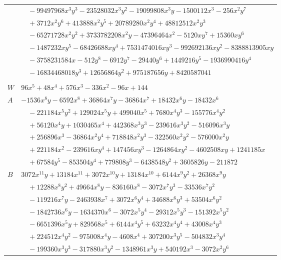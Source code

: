 \documentclass[11pt]{article}
\begin{document}
\begin{longtable}{@{}ll@{}}
 & $\quad -99497968x^{3}y^{3}-23528032x^{3}y^{2}-19099808x^{3}y-1500112x^{3}-256x^{2}y^{7}$\\
 & $\quad +3712x^{2}y^{6}+413888x^{2}y^{5}+20789280x^{2}y^{4}+48812512x^{2}y^{3}$\\
 & $\quad -65271728x^{2}y^{2}+3733782208x^{2}y-47396464x^{2}-5120xy^{7}+15360xy^{6}$\\
 & $\quad -1487232xy^{5}-68426688xy^{4}+7531474016xy^{3}-992692136xy^{2}-8388813905xy$\\
 & $\quad -3758231584x-512y^{8}-6912y^{7}-29440y^{6}+1449216y^{5}-1936990416y^{4}$\\
 & $\quad -16834468018y^{3}+12656864y^{2}+975187656y+8420587041$\\
\addlinespace[3pt]
\multicolumn{2}{@{}l}{$i=19$, $m=48$, neighbours $4,18,24,33,37,38,39$}\\
$W$ & $96x^{5}+48x^{4}+576x^{3}-336x^{2}-96x+144$\\
$A$ & $-1536x^{8}y-6592x^{8}+36864x^{7}y-36864x^{7}+18432x^{6}y-18432x^{6}$\\
 & $\quad -221184x^{5}y^{2}+129024x^{5}y+499040x^{5}+7680x^{4}y^{3}-155776x^{4}y^{2}$\\
 & $\quad +56120x^{4}y+1030465x^{4}+442368x^{3}y^{3}-239616x^{3}y^{2}-516096x^{3}y$\\
 & $\quad +256896x^{3}-36864x^{2}y^{4}+718848x^{2}y^{3}-322560x^{2}y^{2}-576000x^{2}y$\\
 & $\quad +221184x^{2}-239616xy^{4}+147456xy^{3}-1264864xy^{2}-4602508xy+1241185x$\\
 & $\quad +67584y^{5}-853504y^{4}+779808y^{3}-6438548y^{2}+3605826y-211872$\\
$B$ & $3072x^{11}y+13184x^{11}+3072x^{10}y+13184x^{10}+6144x^{9}y^{2}+26368x^{9}y$\\
 & $\quad +12288x^{8}y^{2}+49664x^{8}y-836160x^{8}-3072x^{7}y^{3}-33536x^{7}y^{2}$\\
 & $\quad -119216x^{7}y-2463938x^{7}+3072x^{6}y^{4}+34688x^{6}y^{3}+53504x^{6}y^{2}$\\
 & $\quad -1842736x^{6}y-1634370x^{6}-3072x^{5}y^{4}-29312x^{5}y^{3}-151392x^{5}y^{2}$\\
 & $\quad -6651396x^{5}y+829568x^{5}+6144x^{4}y^{5}+63232x^{4}y^{4}+43008x^{4}y^{3}$\\
 & $\quad +224512x^{4}y^{2}-975008x^{4}y-4608x^{4}+307200x^{3}y^{5}-504832x^{3}y^{4}$\\
 & $\quad -199360x^{3}y^{3}-317880x^{3}y^{2}-1348961x^{3}y+540192x^{3}-3072x^{2}y^{6}$\\

\end{longtable}
\end{document}

